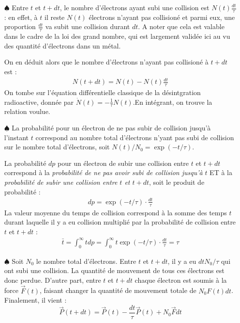 \documentclass{report}
\begin{document}
\begin{itemize}
	
	\item[$\spadesuit$] Entre $t$ et $t+dt$, le nombre d'électrons ayant subi une collision est $N(t)\frac{dt}{\tau}$ : en effet, à $t$ il reste $N(t)$ électrons n'ayant pas collisioné et parmi eux, une proportion $\frac{dt}{\tau}$ va subit une collision durant $dt$. A noter que cela est valable dans le cadre de la loi des grand nombre, qui est largement validée ici au vu des quantité d'électrons dans un métal.
	
	On en déduit alors que le nombre d'électrons n'ayant pas collisioné à $t+dt$ est :
	\begin{align*}
		N(t+dt) = N(t) - N(t)\frac{dt}{\tau}
	\end{align*}
	On tombe sur l'équation différentielle classique de la désintgration radioactive, donnée par $\dot{N}(t)=-\frac{1}{\tau}N(t)$.En intégrant, on trouve la relation voulue.
	
	\item[$\spadesuit$] La probabilité pour un électron de ne pas subir de collision jusqu'à l'instant $t$ correspond au nombre total d'électrons n'yant pas subi de collision sur le nombre total d'électrons, soit $N(t)/N_0=\exp(-t/\tau)$. 
	
	La probabilité $dp$ pour un électron de subir une collision entre $t$ et $t+dt$ correspond à la \textit{probabilité de ne pas avoir subi de collision jusqu'à} $t$ ET à la \textit{probabilité de subir une collision entre $t$ et $t+dt$}, soit le produit de probabilité :
	\begin{align*}
		dp = \exp(-t/\tau)\cdot\frac{dt}{\tau}
	\end{align*}
La valeur moyenne du temps de collision correspond à la somme des temps $t$ durant laquelle il y a eu collision multiplié par la probabilité de collision entre $t$ et $t+dt$ :
	\begin{align*}
		\bar{t}=\int_0^{\infty}tdp=\int_0^{\infty} t\exp(-t/\tau)\cdot\frac{dt}{\tau}=\tau
	\end{align*}
	
	\item[$\spadesuit$] Soit $N_0$ le nombre total d'électrons. Entre $t$ et $t+dt$, il y a eu $dtN_0/\tau$ qui ont subi une collision. La quantité de mouvement de tous ces électrons est donc perdue. D'autre part, entre $t$ et $t+dt$ chaque électron est soumis à la force $\vec{F}(t)$, faisant changer la quantité de mouvement totale de $N_0F(t)dt$. Finalement, il vient :
	\begin{equation}
		\vec{P}(t+dt)=\vec{P}(t)-\frac{dt}{\tau}\vec{P}(t)+N_0\vec{F}dt
	\end{equation}
	

\end{itemize}
\end{document}
